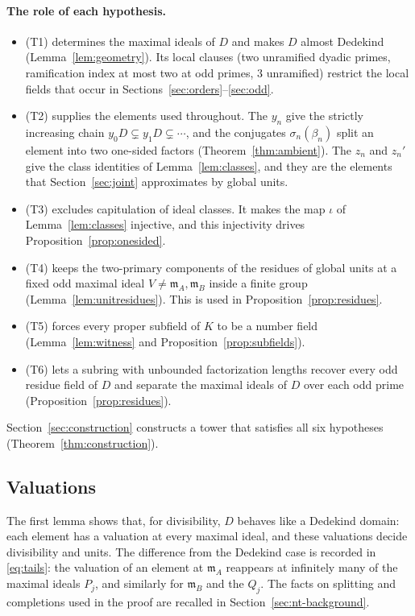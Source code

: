 \documentclass[11pt]{article}
\theoremstyle{plain}
\theoremstyle{definition}
\theoremstyle{remark}
\newcommand{\EA}{\mathfrak m_A}
\newcommand{\EB}{\mathfrak m_B}
\begin{document}
\paragraph{The role of each hypothesis.}
\begin{itemize}
\item (T1) determines the maximal ideals of $D$ and makes $D$ almost
Dedekind (Lemma~\ref{lem:geometry}).  Its local clauses (two unramified
dyadic primes, ramification index at most two at odd primes, $3$
unramified) restrict the local fields that occur in
Sections~\ref{sec:orders}--\ref{sec:odd}.
\item (T2) supplies the elements used throughout.  The $y_n$ give the
strictly increasing chain $y_0D\subsetneq y_1D\subsetneq\cdots$, and the
conjugates $\sigma_n(\beta_n)$ split an element into two one-sided factors
(Theorem~\ref{thm:ambient}).  The $z_n$ and $z_n'$ give the class
identities of Lemma~\ref{lem:classes}, and they are the elements that
Section~\ref{sec:joint} approximates by global units.
\item (T3) excludes capitulation of ideal classes.  It makes the map
$\iota$ of Lemma~\ref{lem:classes} injective, and this injectivity drives
Proposition~\ref{prop:onesided}.
\item (T4) keeps the two-primary components of the residues of global
units at a fixed odd maximal ideal $V\ne\EA,\EB$ inside a finite group
(Lemma~\ref{lem:unitresidues}).  This is used in
Proposition~\ref{prop:residues}.
\item (T5) forces every proper subfield of $K$ to be a number field
(Lemma~\ref{lem:witness} and Proposition~\ref{prop:subfields}).
\item (T6) lets a subring with unbounded factorization lengths recover
every odd residue field of $D$ and separate the maximal ideals of $D$ over
each odd prime (Proposition~\ref{prop:residues}).
\end{itemize}
Section~\ref{sec:construction} constructs a tower that satisfies all six
hypotheses (Theorem~\ref{thm:construction}).

\subsection{Valuations}\label{sec:valuations}

The first lemma shows that, for divisibility, $D$ behaves like a Dedekind
domain: each element has a valuation at every maximal ideal, and these
valuations decide divisibility and units.  The difference from the
Dedekind case is recorded in \eqref{eq:tails}: the valuation of an element
at $\EA$ reappears at infinitely many of the maximal ideals $P_j$, and
similarly for $\EB$ and the $Q_j$.  The facts on splitting and completions
used in the proof are recalled in Section~\ref{sec:nt-background}.
\end{document}
